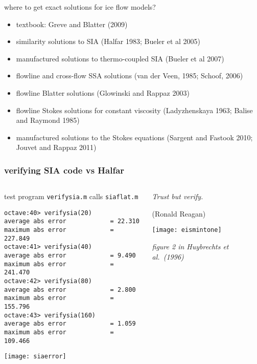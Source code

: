 \begin{frame}{where to get exact solutions for ice flow models?}

\small
\begin{itemize}
  \item textbook: Greve and Blatter (2009)
  \item similarity solutions to SIA (Halfar 1983; Bueler et al 2005)
  \item manufactured solutions to thermo-coupled SIA (Bueler et al 2007)
  \item flowline and cross-flow SSA solutions (van der Veen, 1985; Schoof, 2006)
  \item flowline Blatter solutions (Glowinski and Rappaz 2003)
  \item flowline Stokes solutions for constant viscosity (Ladyzhenskaya 1963; Balise and Raymond 1985)
  \item manufactured solutions to the Stokes equations (Sargent and Fastook 2010; Jouvet and Rappaz 2011)
\end{itemize}
\end{frame}


\begin{frame}[fragile]
\frametitle{verifying SIA code vs Halfar}
\label{slide:verifysia}

\begin{columns}
\begin{column}{0.6\textwidth}
test program \texttt{verifysia.m} calls \texttt{siaflat.m}

\scriptsize
\begin{verbatim}
octave:40> verifysia(20)
average abs error            = 22.310
maximum abs error            = 227.849
octave:41> verifysia(40)
average abs error            = 9.490
maximum abs error            = 241.470
octave:42> verifysia(80)
average abs error            = 2.800
maximum abs error            = 155.796
octave:43> verifysia(160)
average abs error            = 1.059
maximum abs error            = 109.466
\end{verbatim}
\normalsize

\texttt{[image: siaerror]}
\end{column}

\begin{column}{0.4\textwidth}
\small
\emph{Trust but verify.}
\medskip

\scriptsize
(Ronald Reagan)

\bigskip\bigskip\bigskip

\texttt{[image: eismintone]}

\scriptsize \emph{figure 2 in Huybrechts et al.~(1996)}
\end{column}
\end{columns}
\end{frame}


